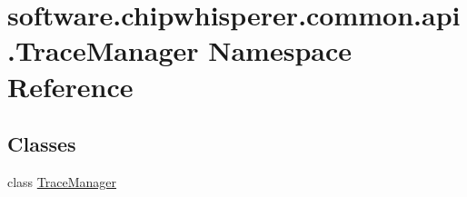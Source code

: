 \hypertarget{namespacesoftware_1_1chipwhisperer_1_1common_1_1api_1_1TraceManager}{}\section{software.\+chipwhisperer.\+common.\+api.\+Trace\+Manager Namespace Reference}
\label{namespacesoftware_1_1chipwhisperer_1_1common_1_1api_1_1TraceManager}
\subsection*{Classes}
\begin{DoxyCompactItemize}
\item 
class \hyperlink{classsoftware_1_1chipwhisperer_1_1common_1_1api_1_1TraceManager_1_1TraceManager}{Trace\+Manager}
\end{DoxyCompactItemize}
